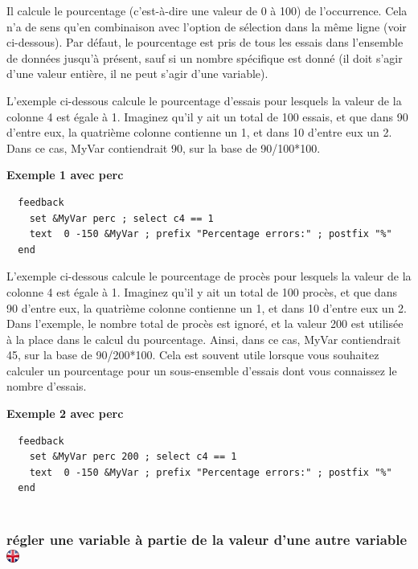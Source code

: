 \documentclass[
]{book}
\begin{document}
Il calcule le pourcentage (c'est-à-dire une valeur de 0 à 100) de
l'occurrence. Cela n'a de sens qu'en combinaison avec l'option de
sélection dans la même ligne (voir ci-dessous). Par défaut, le
pourcentage est pris de tous les essais dans l'ensemble de données
jusqu'à présent, sauf si un nombre spécifique est donné (il doit s'agir
d'une valeur entière, il ne peut s'agir d'une variable).

L'exemple ci-dessous calcule le pourcentage d'essais pour lesquels la
valeur de la colonne 4 est égale à 1. Imaginez qu'il y ait un total de
100 essais, et que dans 90 d'entre eux, la quatrième colonne contienne
un 1, et dans 10 d'entre eux un 2. Dans ce cas, MyVar contiendrait 90,
sur la base de 90/100*100.

\textbf{Exemple 1 avec perc}

\begin{verbatim}
  feedback
    set &MyVar perc ; select c4 == 1
    text  0 -150 &MyVar ; prefix "Percentage errors:" ; postfix "%"
  end
\end{verbatim}

L'exemple ci-dessous calcule le pourcentage de procès pour lesquels la
valeur de la colonne 4 est égale à 1. Imaginez qu'il y ait un total de
100 procès, et que dans 90 d'entre eux, la quatrième colonne contienne
un 1, et dans 10 d'entre eux un 2. Dans l'exemple, le nombre total de
procès est ignoré, et la valeur 200 est utilisée à la place dans le
calcul du pourcentage. Ainsi, dans ce cas, MyVar contiendrait 45, sur la
base de 90/200*100. Cela est souvent utile lorsque vous souhaitez
calculer un pourcentage pour un sous-ensemble d'essais dont vous
connaissez le nombre d'essais.

\textbf{Exemple 2 avec perc}

\begin{verbatim}
  feedback
    set &MyVar perc 200 ; select c4 == 1
    text  0 -150 &MyVar ; prefix "Percentage errors:" ; postfix "%"
  end
  
\end{verbatim}

\hypertarget{ruxe9gler-une-variable-uxe0-partie-de-la-valeur-dune-autre-variable}{%
\subsubsection[régler une variable à partie de la valeur d'une autre
variable ]{\texorpdfstring{régler une variable à partie de la valeur
d'une autre variable
\href{https://www.psytoolkit.org/doc3.1.0/feedback.html\#__just_set_a_variable_to_the_value_of_another_variable}{\protect\includegraphics{img/ukflag.png}}}{régler une variable à partie de la valeur d'une autre variable }}\label{ruxe9gler-une-variable-uxe0-partie-de-la-valeur-dune-autre-variable}}
\end{document}
